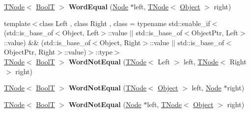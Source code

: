 \begin{DoxyCompactItemize}
\mbox{\hyperlink{classv8_1_1internal_1_1compiler_1_1TNode}{T\+Node}}$<$ \mbox{\hyperlink{structv8_1_1internal_1_1BoolT}{BoolT}} $>$ {\bfseries Word\+Equal} (\mbox{\hyperlink{classv8_1_1internal_1_1compiler_1_1Node}{Node}} $\ast$left, \mbox{\hyperlink{classv8_1_1internal_1_1compiler_1_1TNode}{T\+Node}}$<$ \mbox{\hyperlink{classv8_1_1internal_1_1Object}{Object}} $>$ right)
\item 
\mbox{\label{classv8_1_1internal_1_1compiler_1_1CodeAssembler_a889bd196b630d1b3e6fa01a3e118059a}} 
{\footnotesize template$<$class Left , class Right , class  = typename std\+::enable\+\_\+if$<$                (std\+::is\+\_\+base\+\_\+of$<$\+Object, Left$>$\+::value $\vert$$\vert$                 std\+::is\+\_\+base\+\_\+of$<$\+Object\+Ptr, Left$>$\+::value) \&\&                (std\+::is\+\_\+base\+\_\+of$<$\+Object, Right$>$\+::value $\vert$$\vert$                 std\+::is\+\_\+base\+\_\+of$<$\+Object\+Ptr, Right$>$\+::value)$>$\+::type$>$ }\\\mbox{\hyperlink{classv8_1_1internal_1_1compiler_1_1TNode}{T\+Node}}$<$ \mbox{\hyperlink{structv8_1_1internal_1_1BoolT}{BoolT}} $>$ {\bfseries Word\+Not\+Equal} (\mbox{\hyperlink{classv8_1_1internal_1_1compiler_1_1TNode}{T\+Node}}$<$ Left $>$ left, \mbox{\hyperlink{classv8_1_1internal_1_1compiler_1_1TNode}{T\+Node}}$<$ Right $>$ right)
\item 
\mbox{\label{classv8_1_1internal_1_1compiler_1_1CodeAssembler_a5acf4269e0ec848bba3afde8b5b08f92}} 
\mbox{\hyperlink{classv8_1_1internal_1_1compiler_1_1TNode}{T\+Node}}$<$ \mbox{\hyperlink{structv8_1_1internal_1_1BoolT}{BoolT}} $>$ {\bfseries Word\+Not\+Equal} (\mbox{\hyperlink{classv8_1_1internal_1_1compiler_1_1TNode}{T\+Node}}$<$ \mbox{\hyperlink{classv8_1_1internal_1_1Object}{Object}} $>$ left, \mbox{\hyperlink{classv8_1_1internal_1_1compiler_1_1Node}{Node}} $\ast$right)
\item 
\mbox{\label{classv8_1_1internal_1_1compiler_1_1CodeAssembler_a7ac5485d41ffd8cdb56ee7a6d399acbc}} 
\mbox{\hyperlink{classv8_1_1internal_1_1compiler_1_1TNode}{T\+Node}}$<$ \mbox{\hyperlink{structv8_1_1internal_1_1BoolT}{BoolT}} $>$ {\bfseries Word\+Not\+Equal} (\mbox{\hyperlink{classv8_1_1internal_1_1compiler_1_1Node}{Node}} $\ast$left, \mbox{\hyperlink{classv8_1_1internal_1_1compiler_1_1TNode}{T\+Node}}$<$ \mbox{\hyperlink{classv8_1_1internal_1_1Object}{Object}} $>$ right)

\end{DoxyCompactItemize}
